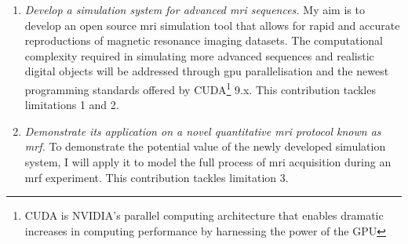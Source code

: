 \begin{enumerate}
    
	\item \textit{Develop a simulation system for advanced \ac{mri} sequences.}
	My aim is to develop an open source \ac{mri} simulation tool that allows for rapid and accurate reproductions of magnetic resonance imaging datasets.
	The computational complexity required in simulating more advanced sequences and realistic digital objects will be addressed
    through \ac{gpu} parallelisation and the newest programming standards offered by CUDA\footnote{CUDA is NVIDIA's parallel computing architecture that enables dramatic increases in computing performance by harnessing the power of the GPU} 9.x.
    This contribution tackles limitations 1 and 2.
	
	\item \textit{Demonstrate its application on a novel quantitative \ac{mri} protocol known as \ac{mrf}.}
	To demonstrate the potential value of the newly developed simulation system, I will apply it to model the full process of \ac{mri} acquisition during an \ac{mrf} experiment.
	This contribution tackles limitation 3.
	


\end{enumerate}
